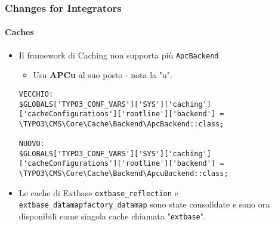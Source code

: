 \begin{frame}[fragile]
	\frametitle{Changes for Integrators}
	\framesubtitle{Caches}

	\lstset{basicstyle=\tiny\ttfamily}

	\begin{itemize}
		\item Il framework di Caching non supporta più \texttt{ApcBackend}

			\begin{itemize}\smaller
				\item[\ding{228}] Usa \textbf{APCu} al suo posto - nota la "u".
			\end{itemize}

\begin{lstlisting}
VECCHIO:
$GLOBALS['TYPO3_CONF_VARS']['SYS']['caching']['cacheConfigurations']['rootline']['backend'] =
\TYPO3\CMS\Core\Cache\Backend\ApcBackend::class;

NUOVO:
$GLOBALS['TYPO3_CONF_VARS']['SYS']['caching']['cacheConfigurations']['rootline']['backend'] =
\TYPO3\CMS\Core\Cache\Backend\ApcuBackend::class;
\end{lstlisting}

		\item Le cache di Extbase \texttt{extbase\_reflection} e \texttt{extbase\_datamapfactory\_datamap}
			sono state consolidate e sono ora disponibili come singola cache chiamata "\texttt{extbase}".

	\end{itemize}

\end{frame}


